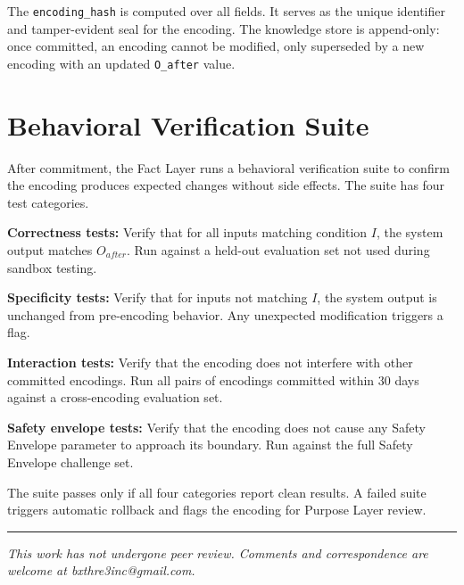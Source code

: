 \documentclass[12pt]{article}
\begin{document}
The \texttt{encoding\_hash} is computed over all fields. It serves as the unique identifier and tamper-evident seal for the encoding. The knowledge store is append-only: once committed, an encoding cannot be modified, only superseded by a new encoding with an updated \texttt{O\_after} value.

\section{Behavioral Verification Suite}
\label{sec:verification-suite}

After commitment, the Fact Layer runs a behavioral verification suite to confirm the encoding produces expected changes without side effects. The suite has four test categories.

\textbf{Correctness tests:} Verify that for all inputs matching condition $I$, the system output matches $O_{after}$. Run against a held-out evaluation set not used during sandbox testing.

\textbf{Specificity tests:} Verify that for inputs not matching $I$, the system output is unchanged from pre-encoding behavior. Any unexpected modification triggers a flag.

\textbf{Interaction tests:} Verify that the encoding does not interfere with other committed encodings. Run all pairs of encodings committed within 30 days against a cross-encoding evaluation set.

\textbf{Safety envelope tests:} Verify that the encoding does not cause any Safety Envelope parameter to approach its boundary. Run against the full Safety Envelope challenge set.

The suite passes only if all four categories report clean results. A failed suite triggers automatic rollback and flags the encoding for Purpose Layer review.





\vspace{2em}
\hrule
\vspace{0.5em}
\noindent\small\textit{This work has not undergone peer review. Comments and correspondence are welcome at bxthre3inc@gmail.com.}
\end{document}
